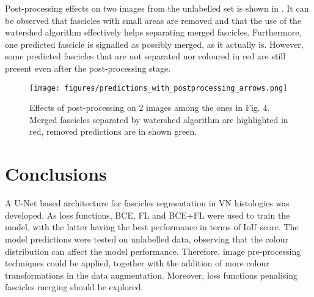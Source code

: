 \documentclass[conference]{IEEEtran}
\begin{document}
Post-processing effects on two images from the unlabelled set is shown in . It can be observed that fascicles with small areas are removed and that the use of the watershed algorithm effectively helps separating merged fascicles. Furthermore, one predicted fascicle is signalled as possibly merged, as it actually is. However, some predicted fascicles that are not separated nor coloured in red are still present even after the post-processing stage.
\begin{figure}
\centering
\texttt{[image: figures/predictions\_with\_postprocessing\_arrows.png]}
\caption{Effects of post-processing on 2  images among the ones in Fig. 4. Merged fascicles separated by watershed algorithm are highlighted in red, removed predictions are in shown green.}
\label{fig:postprocessing}
\end{figure}


\section{Conclusions}
A U-Net based architecture for fascicles segmentation in VN histologies was developed. As loss functions, BCE, FL and BCE+FL were used to train the model, with the latter having the best performance in terms of IoU score. The model predictions were tested on unlabelled data, observing that the colour distribution can affect the model performance. Therefore, image pre-processing techniques could be applied, together with the addition of more colour transformations in the data augmentation. Moreover, loss functions penalising fascicles merging should be explored.

\newpage
\nocite{*}
\printbibliography
\end{document}
